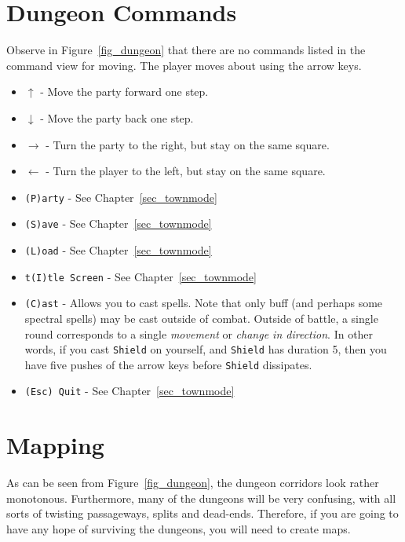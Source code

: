 \documentclass{report}
\begin{document}
\section{Dungeon Commands}
    Observe in Figure~\ref{fig_dungeon} that there are no commands listed in the command view for moving. The player moves about using the arrow keys.
    \begin{itemize}
        \item {\color{green!50!black} $\uparrow$} - Move the party forward one step.
        \item {\color{green!50!black} $\downarrow$} - Move the party back one step.
        \item {\color{green!50!black} $\rightarrow$} - Turn the party to the right, but stay on the same square.
        \item {\color{green!50!black} $\leftarrow$} - Turn the player to the left, but stay on the same square.
        \item \verb|(P)arty| - See Chapter~\ref{sec_townmode}
        \item \verb|(S)ave| - See Chapter~\ref{sec_townmode}
        \item \verb|(L)oad| - See Chapter~\ref{sec_townmode}
        \item \verb|t(I)tle Screen| - See Chapter~\ref{sec_townmode}
        \item \verb|(C)ast| - Allows you to cast spells. Note that only buff
        (and perhaps some spectral spells) may be cast outside of combat. Outside
        of battle, a single round corresponds to a single \emph{movement} or
        \emph{change in direction}. In 
        other words, if you cast \verb|Shield| on yourself, and \verb|Shield| has
        duration 5, then you have five pushes of the arrow keys before 
        \verb|Shield| dissipates.
        \item \verb|(Esc) Quit| - See Chapter~\ref{sec_townmode}
    \end{itemize}

\section{Mapping}
    As can be seen from Figure~\ref{fig_dungeon}, the dungeon corridors look rather
    monotonous. Furthermore, many of the dungeons will be very confusing, with all
    sorts of twisting passageways, splits and dead-ends. Therefore, if you are going
    to have any hope of surviving the dungeons, you will need to create maps. 
\end{document}
